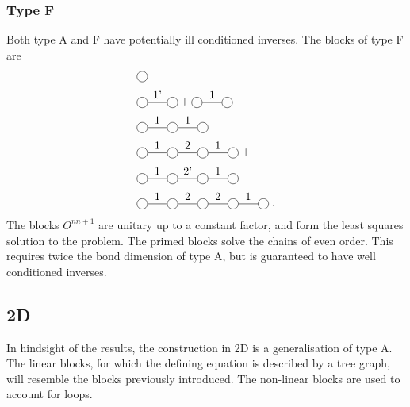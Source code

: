 \documentclass[twocolumn]{article}
\newcounter{a}
\newcounter{b}
\begin{document}
\subsubsection{Type F}
Both type A and F have potentially ill conditioned inverses. The blocks of type F are
\begin{subequations}
    \begin{align}
         & \mpob{1}{ {,}  }{}{}{}{{,,}}                                          \\
         & \mpob{2}{ {,"1'",}  }{}{}{}{{,,}}+  \mpob{2}{ {,"1",}  }{}{}{}{{,,}} \\
         & \mpob{3}{ {,"1","1",}  }{}{}{}{{,,,}}                                 \\
         & \mpob{4}{ {,"1","2","1",}  }{}{}{}{{,,,,,}} \; +  \nonumber           \\
         & \mpob{4}{ {,"1","2'","1",}  }{}{}{}{{,,,,,}}                          \\
         & \mpob{5}{ {,"1","2","2","1",}  }{}{}{}{{,,,,,}} \;.
    \end{align}
\end{subequations}
The blocks $O^{n n+1}$ are unitary up to a constant factor, and form the least squares solution to the problem. The primed blocks solve the chains of even order. This requires twice the bond dimension of type A, but is guaranteed to have well conditioned inverses.

\subsection{2D}
In hindsight of the results, the construction in 2D is a generalisation of type A. The linear blocks, for which the defining equation is described by a tree graph, will resemble the blocks previously introduced. The non-linear blocks are used to account for loops.
\end{document}
